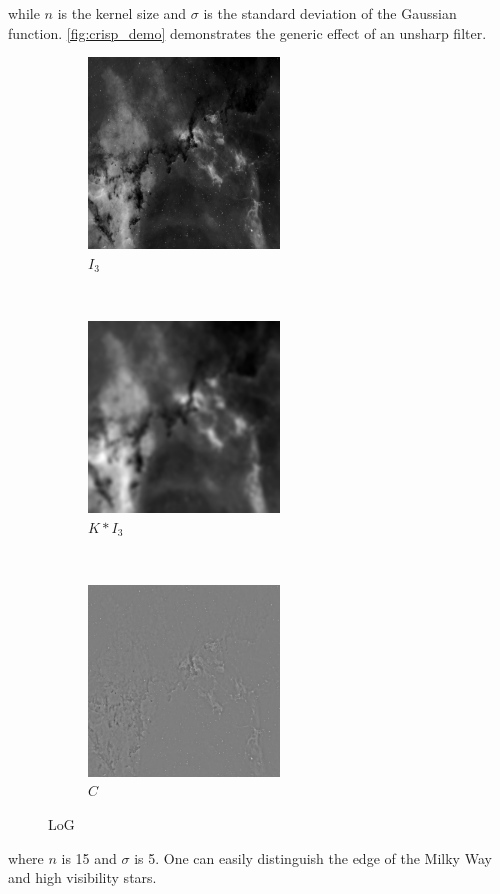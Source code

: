 \documentclass[12pt]{article}
\begin{document}
\noindent
while $n$ is the kernel size and $\sigma$ is the standard deviation of the Gaussian function.
\autoref{fig:crisp_demo} demonstrates the generic effect of an unsharp filter.
\begin{figure}[H]
    \centering
    \begin{subfigure}[t]{0.3\textwidth}
        \centering
        \includegraphics[height=2in]{images/crisp_raw}
        \caption{$I_3$}
    \end{subfigure}%
    ~ 
    \begin{subfigure}[t]{0.3\textwidth}
        \centering
        \includegraphics[height=2in]{images/crisp_smooth}
        \caption{$K \ast I_3$}
    \end{subfigure}%
    ~
    \begin{subfigure}[t]{0.3\textwidth}
        \centering
        \includegraphics[height=2in]{images/crisp_crisp}
        \caption{$C$}
    \end{subfigure}
    \caption{LoG}
    \label{fig:crisp_demo}
\end{figure}
where $n$ is 15 and $\sigma$ is 5. One can easily distinguish the edge of the Milky Way and high visibility stars.
\end{document}
